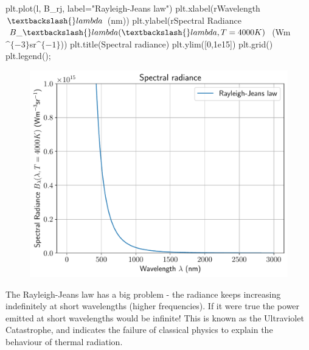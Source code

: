 \documentclass[
  letterpaper,
  DIV=11,
  numbers=noendperiod]{scrreprt}
\newenvironment{Shaded}{\begin{snugshade}}{\end{snugshade}}
\newcommand{\DecValTok}[1]{\textcolor[rgb]{0.68,0.00,0.00}{#1}}
\newcommand{\FloatTok}[1]{\textcolor[rgb]{0.68,0.00,0.00}{#1}}
\newcommand{\NormalTok}[1]{\textcolor[rgb]{0.00,0.23,0.31}{#1}}
\newcommand{\OperatorTok}[1]{\textcolor[rgb]{0.37,0.37,0.37}{#1}}
\newcommand{\StringTok}[1]{\textcolor[rgb]{0.13,0.47,0.30}{#1}}
\newcommand{\VerbatimStringTok}[1]{\textcolor[rgb]{0.13,0.47,0.30}{#1}}
\begin{document}
\begin{Shaded}
\begin{Highlighting}[]
\NormalTok{plt.plot(l, B\_rj, label}\OperatorTok{=}\StringTok{"Rayleigh{-}Jeans law"}\NormalTok{)}
\NormalTok{plt.xlabel(}\VerbatimStringTok{r\textquotesingle{}Wavelength $\textbackslash{}lambda$ (nm)\textquotesingle{}}\NormalTok{)}
\NormalTok{plt.ylabel(}\VerbatimStringTok{r\textquotesingle{}Spectral Radiance $B\_\textbackslash{}lambda(\textbackslash{}lambda, T=4000K)$ (Wm$\^{}\{{-}3\}$sr$\^{}\{{-}1\}$)\textquotesingle{}}\NormalTok{)}
\NormalTok{plt.title(}\StringTok{\textquotesingle{}Spectral radiance\textquotesingle{}}\NormalTok{)}
\NormalTok{plt.ylim([}\DecValTok{0}\NormalTok{,}\FloatTok{1e15}\NormalTok{])}
\NormalTok{plt.grid()}
\NormalTok{plt.legend()}\OperatorTok{;}
\end{Highlighting}
\end{Shaded}

\begin{figure}[H]

{\centering \includegraphics{SP1.1_-_Stellar_Properties_files/figure-pdf/cell-18-output-1.pdf}

}

\end{figure}

The Rayleigh-Jeans law has a big problem - the radiance keeps increasing
indefinitely at short wavelengths (higher frequencies). If it were true
the power emitted at short wavelengths would be infinite! This is known
as the Ultraviolet Catastrophe, and indicates the failure of classical
physics to explain the behaviour of thermal radiation.
\end{document}
